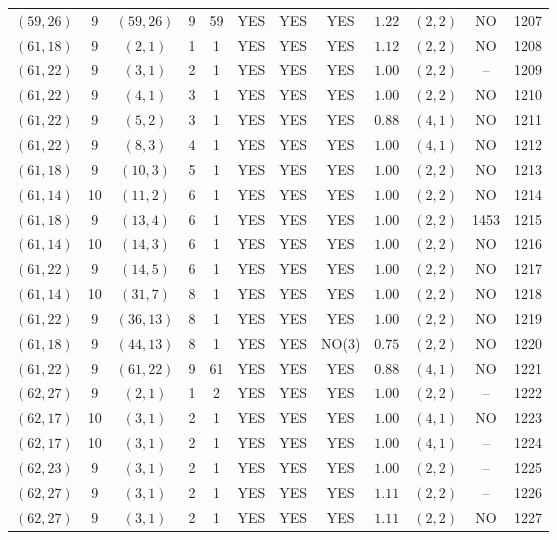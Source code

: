\begin{longtable}{|c|c|c|c|c|c|c|c|c|c|c|c|}
$(59,26)$ & 9 & $(59,26)$ & 9 & 59 & YES & YES & YES & $1.22$ & $(2,2)$ & NO & 1207\\
$(61,18)$ & 9 & $(2,1)$ & 1 & 1 & YES & YES & YES & $1.12$ & $(2,2)$ & NO & 1208\\
$(61,22)$ & 9 & $(3,1)$ & 2 & 1 & YES & YES & YES & $1.00$ & $(2,2)$ & -- & 1209\\
$(61,22)$ & 9 & $(4,1)$ & 3 & 1 & YES & YES & YES & $1.00$ & $(2,2)$ & NO & 1210\\
$(61,22)$ & 9 & $(5,2)$ & 3 & 1 & YES & YES & YES & $0.88$ & $(4,1)$ & NO & 1211\\
$(61,22)$ & 9 & $(8,3)$ & 4 & 1 & YES & YES & YES & $1.00$ & $(4,1)$ & NO & 1212\\
$(61,18)$ & 9 & $(10,3)$ & 5 & 1 & YES & YES & YES & $1.00$ & $(2,2)$ & NO & 1213\\
$(61,14)$ & 10 & $(11,2)$ & 6 & 1 & YES & YES & YES & $1.00$ & $(2,2)$ & NO & 1214\\
$(61,18)$ & 9 & $(13,4)$ & 6 & 1 & YES & YES & YES & $1.00$ & $(2,2)$ & 1453 & 1215\\
$(61,14)$ & 10 & $(14,3)$ & 6 & 1 & YES & YES & YES & $1.00$ & $(2,2)$ & NO & 1216\\
$(61,22)$ & 9 & $(14,5)$ & 6 & 1 & YES & YES & YES & $1.00$ & $(2,2)$ & NO & 1217\\
$(61,14)$ & 10 & $(31,7)$ & 8 & 1 & YES & YES & YES & $1.00$ & $(2,2)$ & NO & 1218\\
$(61,22)$ & 9 & $(36,13)$ & 8 & 1 & YES & YES & YES & $1.00$ & $(2,2)$ & NO & 1219\\
$(61,18)$ & 9 & $(44,13)$ & 8 & 1 & YES & YES & NO(3) & $0.75$ & $(2,2)$ & NO & 1220\\
$(61,22)$ & 9 & $(61,22)$ & 9 & 61 & YES & YES & YES & $0.88$ & $(4,1)$ & NO & 1221\\
$(62,27)$ & 9 & $(2,1)$ & 1 & 2 & YES & YES & YES & $1.00$ & $(2,2)$ & -- & 1222\\
$(62,17)$ & 10 & $(3,1)$ & 2 & 1 & YES & YES & YES & $1.00$ & $(4,1)$ & NO & 1223\\
$(62,17)$ & 10 & $(3,1)$ & 2 & 1 & YES & YES & YES & $1.00$ & $(4,1)$ & -- & 1224\\
$(62,23)$ & 9 & $(3,1)$ & 2 & 1 & YES & YES & YES & $1.00$ & $(2,2)$ & -- & 1225\\
$(62,27)$ & 9 & $(3,1)$ & 2 & 1 & YES & YES & YES & $1.11$ & $(2,2)$ & -- & 1226\\
$(62,27)$ & 9 & $(3,1)$ & 2 & 1 & YES & YES & YES & $1.11$ & $(2,2)$ & NO & 1227\\

\end{longtable}
